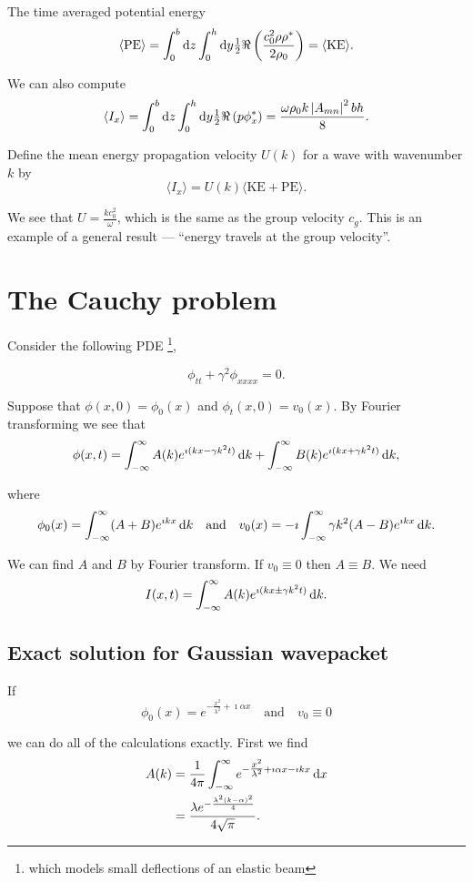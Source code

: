 \documentclass{notes}
\begin{document}
The time averaged potential energy
\[
\langle \text{PE} \rangle = \int_0^b \mathrm{d} z \int_0^h \mathrm{d} y
\tfrac{1}{2} \Re \left( \frac{c_0^2 \rho \rho^\ast}{2 \rho_0}\right)
= \langle \text{KE} \rangle.
\]

We can also compute
\[
\langle I_x \rangle = \int_0^b\mathrm{d} z \int_0^h \mathrm{d} y \tfrac{1}{2}
\Re \left( p \phi_x^\ast\right)
= \frac{\omega \rho_0 k \left|A_{mn}\right|^2 bh}{8}.
\]

Define the mean energy propagation velocity
$U(k)$ for a wave with wavenumber $k$ by
\[
\langle I_x \rangle = U(k) \langle \text{KE} + \text{PE} \rangle.
\]

We see that $U = \tfrac{k c_0^2}{\omega}$, which is the
same as the group velocity $c_g$.  This is an example of a
general result  --- ``energy travels at the group velocity''.

\section{The Cauchy problem}

Consider the following PDE%
\footnote{which models small deflections of an elastic beam},

\[
\phi_{tt} + \gamma^2 \phi_{xxxx} = 0.
\]

Suppose that $\phi(x,0) = \phi_0(x)$ and $\phi_t(x,0) = v_0(x)$.
By Fourier transforming we see that
\begin{equation}\label{eq:gencauchy}
\phi(x,t) = \int_{-\infty}^\infty A(k) e^{\imath(k x - \gamma k^2 t)}\,
\mathrm{d} k + \int_{-\infty}^\infty B(k) e^{\imath(k x + \gamma k^2 t)}\,
\mathrm{d} k,
\end{equation}

where
\[
\phi_0(x) = \int_{-\infty}^\infty (A + B) e^{\imath k x}\, \mathrm{d} k
\quad \text{and} \quad
v_0(x) = - \imath \int_{-\infty}^\infty \gamma k^2 ( A - B ) e^{\imath k x}\,
\mathrm{d} k.
\]

We can find $A$ and $B$ by Fourier transform.  If $v_0 \equiv 0$
then $A \equiv B$.  We need
\[
I(x,t) = \int_{-\infty}^\infty A(k) e^{\imath (k x \pm \gamma k^2 t)}\,
\mathrm{d} k.
\]

\subsection{Exact solution for Gaussian wavepacket}

If
\[
\phi_0(x) = e^{- \tfrac{x^2}{\lambda^2} + \imath \alpha x} \quad \text{and}
\quad v_0 \equiv 0
\]

we can do all of the calculations exactly.  First
we find
\begin{align*}
A(k) &= \frac{1}{4\pi} \int_{-\infty}^\infty
e^{- \tfrac{x^2}{\lambda^2} + \imath \alpha x - \imath k x}\, \mathrm{d} x\\
&= \frac{\lambda e^{- \frac{\lambda^2(k-\alpha)^2}{4}}}{4 \sqrt{\pi}}.
\end{align*}
\end{document}
